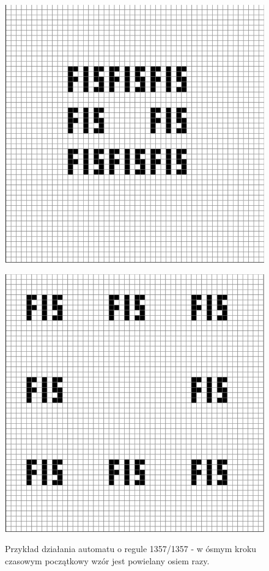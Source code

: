 \documentclass[12pt] {article}
\begin{document}
\begin{figure}[H]
\begin{minipage}[t]{.3\textwidth}
        \includegraphics[width=\textwidth]{res/rep2_8.png}
        \label{fig:r5}
    \end{minipage}
    \hfill
    \begin{minipage}[t]{.3\textwidth}
        \centering
        \includegraphics[width=\textwidth]{res/rep2_16.png}
        \label{fig:r6}
    \end{minipage}
    \caption{Przykład działania automatu o regule 1357/1357 - w ósmym kroku czasowym początkowy wzór jest powielany osiem razy.}
    \label{fig:rep}
\end{figure}
\end{document}
